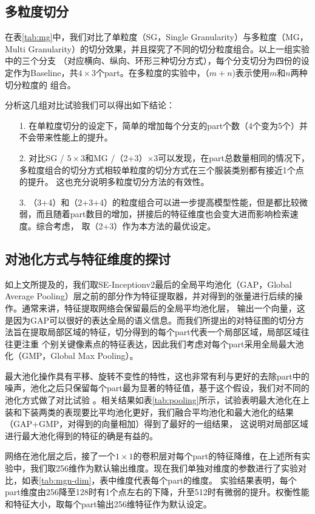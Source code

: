\subsection{多粒度切分}
在表\ref{tab:mg}中，我们对比了单粒度（SG，Single Granularity）与多粒度（MG，Multi Granularity）的切分效果，并且探究了不同的切分粒度组合。以上一组实验中的三个分支
（对应横向、纵向、环形三种切分方式），每个分支切分为四份的设定作为Baseline，共$4 \times 3$个part。在多粒度的实验中，（$m + n$)表示使用$m$和$n$两种切分粒度的
组合。


分析这几组对比试验我们可以得出如下结论：
\begin{itemize}
  \item[1.]在单粒度切分的设定下，简单的增加每个分支的part个数（4个变为5个）并不会带来性能上的提升。
  \item[2.]对比SG / $5\times3$和MG /（2+3）$\times3$可以发现，在part总数量相同的情况下，多粒度组合的切分方式相较单粒度的切分方式在三个服装类别都有接近1个点的提升。
    这也充分说明多粒度切分方法的有效性。
  \item[3.]（3+4）和（2+3+4）的粒度组合可以进一步提高模型性能，但是都比较微弱，而且随着part数目的增加，拼接后的特征维度也会变大进而影响检索速度。综合考虑，
    取（2+3）作为本方法的最优设定。
\end{itemize}
\subsection{对池化方式与特征维度的探讨}
如上文所提及的，我们取SE-Inceptionv2最后的全局平均池化（GAP，Global Average Pooling）层之前的部分作为特征提取器，并对得到的张量进行后续的操作。通常来讲，特征提取网络会保留最后的全局平均池化层，
输出一个向量，这是因为GAP可以很好的表达全局的语义信息。而我们所提出的对特征图的切分方法旨在提取局部区域的特征，切分得到的每个part代表一个局部区域，局部区域往往更注重
个别关键像素点的特征表达，因此我们考虑对每个part采用全局最大池化（GMP，Global Max Pooling）。

最大池化操作具有平移、旋转不变性的特性，这也非常有利与更好的去除part中的噪声，池化之后只保留每个part最为显著的特征值，基于这个假设，我们对不同的池化方式做了对比试验
。相关结果如表\ref{tab:pooling}所示，试验表明最大池化在上装和下装两类的表现要比平均池化更好，我们融合平均池化和最大池化的结果（GAP+GMP，对得到的向量相加）得到了最好的一组结果，
这说明对局部区域进行最大池化得到的特征的确是有益的。



网络在池化层之后，接了一个$1\times1$的卷积层对每个part的特征降维，在上述所有实验中，我们取256维作为默认输出维度。现在我们单独对维度的参数进行了实验对比，如表\ref{tab:mgn-dim}，表中维度代表每个part的维度。
实验结果表明，每个part维度由256降至128时有1个点左右的下降，升至512时有微弱的提升。权衡性能和特征大小，取每个part输出256维特征作为默认设定。

